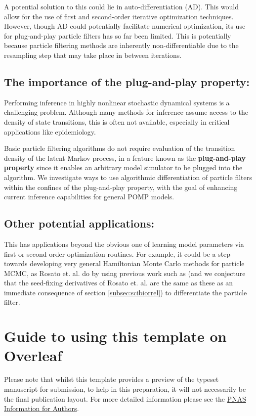 \documentclass[9pt,twocolumn,twoside]{pnas-new}
\begin{document}
A potential solution to this could lie in auto-differentiation (AD). This would allow for the use of first and second-order iterative optimization techniques. However, though AD could potentially facilitate numerical optimization, its use for plug-and-play particle filters has so far been limited. This is potentially because particle filtering methods are inherently non-differentiable due to the resampling step that may take place in between iterations. 

\subsection*{The importance of the plug-and-play property:} Performing inference in highly nonlinear stochastic dynamical systems is a challenging problem. Although many methods for inference assume access to the density of state transitions, this is often not available, especially in critical applications like epidemiology.

Basic particle filtering algorithms do not require evaluation of the transition density of the latent Markov process, in a feature known as the \textbf{plug-and-play property} \cite{Breto_timeseriesmech} since it enables an arbitrary model simulator to be plugged into the algorithm. We investigate ways to use algorithmic differentiation of particle filters within the confines of the plug-and-play property, with the goal of enhancing current inference capabilities for general POMP models.

\subsection*{Other potential applications:} This has applications beyond the obvious one of learning model parameters via first or second-order optimization routines. For example, it could be a step towards developing very general Hamiltonian Monte Carlo methods for particle MCMC, as Rosato et. al. \cite{rosato22b} do by using previous work such as \cite{scibior2021dpf, doucet2011sf} (and we conjecture that the seed-fixing derivatives of Rosato et. al. are the same as these as an immediate consequence of section \ref{subsec:scibiorrel}) to differentiate the particle filter. 

\section*{Guide to using this template on Overleaf}

Please note that whilst this template provides a preview of the typeset manuscript for submission, to help in this preparation, it will not necessarily be the final publication layout. For more detailed information please see the \href{https://www.pnas.org/page/authors/format}{PNAS Information for Authors}.
\end{document}
